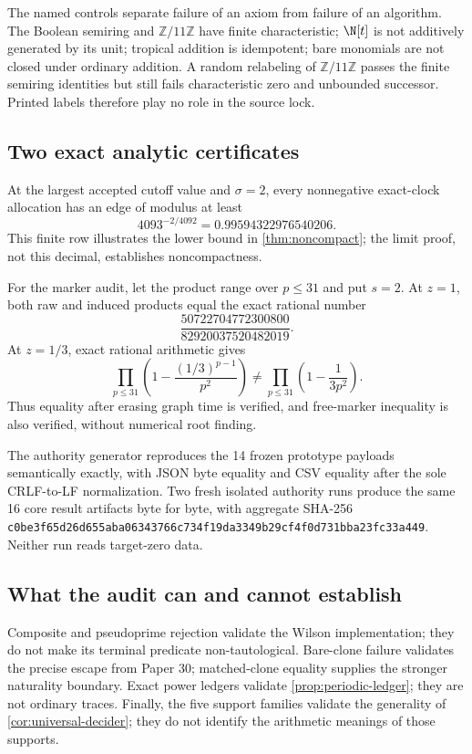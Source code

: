 The named controls separate failure of an axiom from failure of an algorithm.
The Boolean semiring and $\mathbb Z/11\mathbb Z$ have finite characteristic;
$\N[t]$ is not additively generated by its unit; tropical addition is
idempotent; bare monomials are not closed under ordinary addition.  A random
relabeling of $\mathbb Z/11\mathbb Z$ passes the finite semiring identities but
still fails characteristic zero and unbounded successor.  Printed labels
therefore play no role in the source lock.

\subsection{Two exact analytic certificates}

At the largest accepted cutoff value and $\sigma=2$, every nonnegative
exact-clock allocation has an edge of modulus at least
\[
  4093^{-2/4092}=0.99594322976540206.
\]
This finite row illustrates the lower bound in \cref{thm:noncompact}; the
limit proof, not this decimal, establishes noncompactness.

For the marker audit, let the product range over $p\leq31$ and put $s=2$.
At $z=1$, both raw and induced products equal the exact rational number
\[
  \frac{50722704772300800}{82920037520482019}.
\]
At $z=1/3$, exact rational arithmetic gives
\[
  \prod_{p\leq31}\left(1-\frac{(1/3)^{p-1}}{p^2}\right)
  \neq
  \prod_{p\leq31}\left(1-\frac{1}{3p^2}\right).
\]
Thus equality after erasing graph time is verified, and free-marker
inequality is also verified, without numerical root finding.

The authority generator reproduces the 14 frozen prototype payloads
semantically exactly, with JSON byte equality and CSV equality after the sole
CRLF-to-LF normalization.  Two fresh isolated authority runs produce the same
16 core result artifacts byte for byte, with aggregate SHA-256
\texttt{c0be3f65d26d655aba06343766c734f19da3349b29cf4f0d731bba23fc33a449}.
Neither run reads target-zero data.

\subsection{What the audit can and cannot establish}

Composite and pseudoprime rejection validate the Wilson implementation; they
do not make its terminal predicate non-tautological.  Bare-clone failure
validates the precise escape from Paper 30; matched-clone equality supplies
the stronger naturality boundary.  Exact power ledgers validate
\cref{prop:periodic-ledger}; they are not ordinary traces.  Finally, the five
support families validate the generality of \cref{cor:universal-decider};
they do not identify the arithmetic meanings of those supports.
